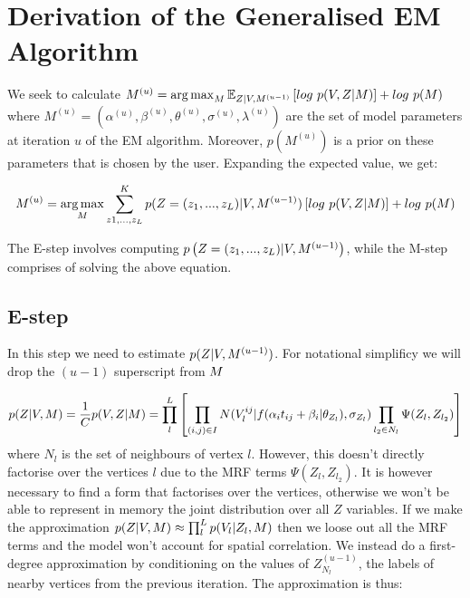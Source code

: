 \section{Derivation of the Generalised EM Algorithm}
\label{sec:diveEmDerivAppendix}

We seek to calculate $M^{(u)} = \argmax_{M} \mathbb{E}_{Z|V,M^{(u-1)}} \left[log\ p(V,Z|M)\right] + log\ p(M)$  where $M^{(u)} = (\alpha^{(u)}, \beta^{(u)}, \theta^{(u)}, \sigma^{(u)}, \lambda^{(u)})$ are the set of model parameters at iteration $u$ of the EM algorithm. Moreover, $p(M^{(u)})$ is a prior on these parameters that is chosen by the user. Expanding the expected value, we get:

\begin{equation}
\label{eq:EM1}
M^{(u)} = \operatorname*{arg\,max}_{M} \sum_{z1,\dots, z_L}^K p(Z = (z_1, ..., z_L) | V, M^{(u-1)}) \left[log\ p(V,Z|M)\right] + log\ p(M) 
\end{equation}


The E-step involves computing $p\left(Z = (z_1, ..., z_L)| V, M^{(u-1)}\right)$, while the M-step comprises of solving the above equation. 


\subsection{E-step}

In this step we need to estimate $p(Z | V, M^{(u-1)})$. For notational simplificy we will drop the $(u-1)$ superscript from $M$

\begin{equation}
 p(Z | V, M) = \frac{1}{C}  p(V, Z | M) =  \prod_l^L \left[ \prod_{(i,j) \in I} N(V_l^{ij} | f(\alpha_i t_{ij} + \beta_i | \theta_{Z_l}), \sigma_{Z_l})  \prod_{l_2 \in N_l} \Psi (Z_{l}, Z_{l_2}) \right]
\end{equation}
where $N_l$ is the set of neighbours of vertex $l$. However, this doesn't directly factorise over the vertices $l$ due to the MRF terms $\Psi (Z_{l}, Z_{l_2})$. It is however necessary to find a form that factorises over the vertices, otherwise we won't be able to represent in memory the joint distribution over all $Z$ variables. If we make the approximation $p(Z | V, M) \approx \prod_l^L p(V_l|Z_l, M)$ then we loose out all the MRF terms and the model won't account for spatial correlation. We instead do a first-degree approximation by conditioning on the values of $Z_{N_l}^{(u-1)}$, the labels of nearby vertices from the previous iteration. The approximation is thus:

